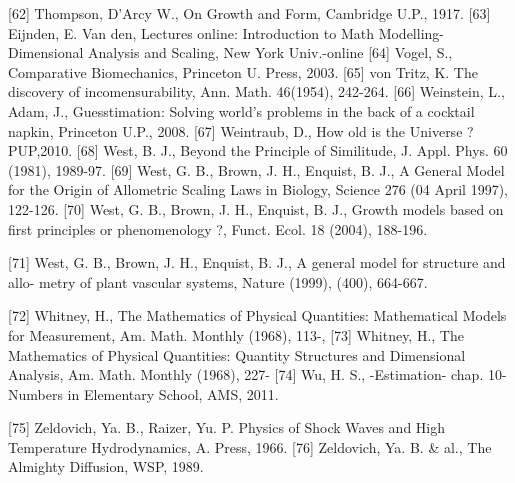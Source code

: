 [62] Thompson, D’Arcy W., On Growth and Form, Cambridge U.P., 1917.
[63] Eijnden, E. Van den, Lectures online: Introduction to Math Modelling-Dimensional
Analysis and Scaling, New York Univ.-online
[64] Vogel, S., Comparative Biomechanics, Princeton U. Press, 2003.
[65] von Tritz, K. The discovery of incomensurability, Ann. Math. 46(1954), 242-264.
[66] Weinstein, L., Adam, J., Guesstimation: Solving world’s problems in the back of a
cocktail napkin, Princeton U.P., 2008.
[67] Weintraub, D., How old is the Universe ? PUP,2010.
[68] West, B. J., Beyond the Principle of Similitude, J. Appl. Phys. 60 (1981), 1989-97.
[69] West, G. B., Brown, J. H., Enquist, B. J., A General Model for the Origin of
Allometric Scaling Laws in Biology, Science 276 (04 April 1997), 122-126.
[70] West, G. B., Brown, J. H., Enquist, B. J., Growth models based on first principles
or phenomenology ?, Funct. Ecol. 18 (2004), 188-196.

[71] West, G. B., Brown, J. H., Enquist, B. J., A general model for structure and allo-
metry of plant vascular systems, Nature (1999), (400), 664-667.

[72] Whitney, H., The Mathematics of Physical Quantities: Mathematical Models for
Measurement, Am. Math. Monthly (1968), 113-,
[73] Whitney, H., The Mathematics of Physical Quantities: Quantity Structures and
Dimensional Analysis, Am. Math. Monthly (1968), 227-
[74] Wu, H. S., -Estimation- chap. 10-Numbers in Elementary School, AMS, 2011.

[75] Zeldovich, Ya. B., Raizer, Yu. P. Physics of Shock Waves and High Temperature
Hydrodynamics, A. Press, 1966.
[76] Zeldovich, Ya. B. & al., The Almighty Diffusion, WSP, 1989.
